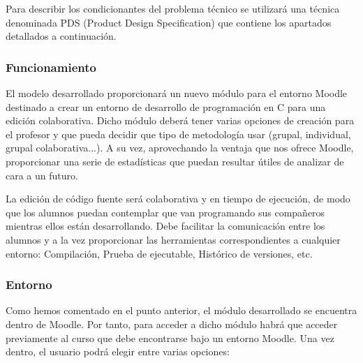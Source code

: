 Para describir los condicionantes del problema técnico se utilizará una técnica denominada PDS (Product Design Specification) que contiene los apartados detallados a continuación.

\subsubsection{Funcionamiento}

El modelo desarrollado proporcionará un nuevo módulo para el entorno Moodle destinado a crear un entorno de desarrollo de programación en C para una edición colaborativa. Dicho módulo deberá tener varias opciones de creación para el profesor y que pueda decidir que tipo de metodología usar (grupal, individual, grupal colaborativa...).  A su vez, aprovechando la ventaja que nos ofrece Moodle, proporcionar una serie de estadísticas que puedan resultar útiles de analizar de cara a un futuro.

La edición de código fuente será colaborativa y en tiempo de ejecución, de modo que los alumnos puedan contemplar que van programando sus compañeros mientras ellos están desarrollando. Debe facilitar la comunicación entre los alumnos y a la vez proporcionar las herramientas correspondientes a cualquier entorno: Compilación, Prueba de ejecutable, Histórico de versiones, etc.

\subsubsection{Entorno}

Como hemos comentado en el punto anterior, el módulo desarrollado se encuentra dentro de Moodle. Por tanto, para acceder a dicho módulo habrá que acceder previamente al curso que debe encontrarse bajo un entorno Moodle. Una vez dentro, el usuario podrá elegir entre varias opciones:

